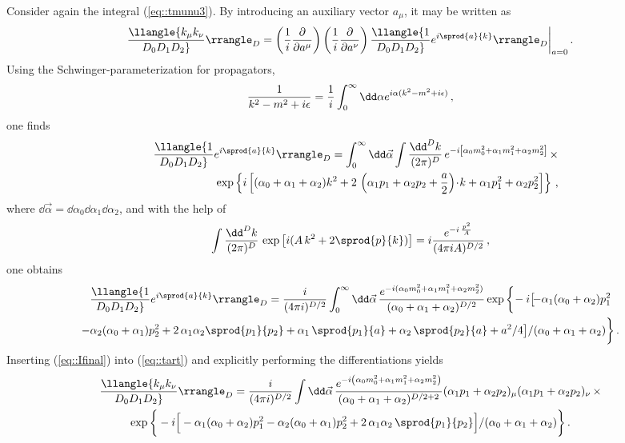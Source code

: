 Consider again the integral (\ref{eq::tmunu3}). By introducing an
auxiliary vector $a_\mu$, it may be written as
%
\begin{eqnarray}\label{eq::tart}
\llangle {k_\mu k_\nu\over D_0 D_1 D_2}\rrangle_D =
\left({1\over i}{\partial\over \partial a^\mu}\right)
\left({1\over i}{\partial\over \partial a^\nu}\right)
\llangle {1\over D_0 D_1 D_2} e^{i\sprod{a}{k}}\rrangle_D \bigg|_{a=0}\,.
\end{eqnarray}
%
Using the Schwinger-parameterization for propagators,
%
\begin{equation}
{1\over k^2-m^2+i\epsilon} = {1\over i}\int_0^\infty\dd\alpha
e^{i\alpha(k^2-m^2+i\epsilon)}\,,
\end{equation}
%
one finds
%
\begin{eqnarray}
  && \llangle {1\over D_0 D_1 D_2} e^{i\sprod{a}{k}}\rrangle_D =
  \int_0^\infty\dd\vec{\alpha} \int{\dd^D k\over (2\pi)^D}
  \,e^{-i\left[\alpha_0m_0^2 + \alpha_1m_1^2 + \alpha_2m_2^2\right]}\,
  \times\nonumber\\&&\mbox{\hspace{1ex}} \exp\left\{i\left[(\alpha_0 +
  \alpha_1 + \alpha_2)k^2 + 2\,\left(\alpha_1 p_1 + \alpha_2 p_2 +
  {a\over 2}\right)\!\cdot\!k + \alpha_1 p_1^2 + \alpha_2
  p_2^2\right]\right\}\,,
\end{eqnarray}
%
where $\dd\vec\alpha = \dd\alpha_0\dd\alpha_1\dd\alpha_2$, and with the
help of
%
\begin{equation}
\int {\dd^D k\over (2\pi)^D}\,\exp\left[i(A\,k^2 + 2\sprod{p}{k})\right] =
i{e^{-i\,{p^2\over A}}\over (4\pi i A)^{D/2}}\,,
\end{equation}
%
one obtains
%
\begin{multline}\label{eq::Ifinal}
 \llangle {1\over D_0 D_1 D_2} e^{i\sprod{a}{k}}\rrangle_D =
{i\over (4\pi i)^{D/2}}\int_0^\infty \dd\vec\alpha \,
{e^{-i(\alpha_0m_0^2 + \alpha_1m_1^2 + \alpha_2m_2^2)} \over 
  (\alpha_0 + \alpha_1 + \alpha_2)^{D/2}}  
\exp\bigg\{\!-i\bigl[\!-\alpha_1(\alpha_0 + \alpha_2)p_1^2 
\\- \alpha_2(\alpha_0 + \alpha_1)p_2^2  +
  2\,\alpha_1\alpha_2
  \sprod{p_1}{p_2} + 
 \alpha_1\,\sprod{p_1}{a} +
  \alpha_2\,\sprod{p_2}{a} + a^2/4\bigr]
  /(\alpha_0 
  + \alpha_1 + \alpha_2)\bigg\}\,.
\end{multline}
%
Inserting (\ref{eq::Ifinal}) into (\ref{eq::tart}) and explicitly
performing the differentiations yields
%
\begin{multline}
\llangle{k_\mu k_\nu\over D_0 D_1 D_2}\rrangle_D =
{i\over (4\pi i)^{D/2}}\int\dd \vec\alpha\,
{e^{-i\left(\alpha_0m_0^2 + \alpha_1m_1^2 + \alpha_2m_2^2\right)}
  \over
  (\alpha_0 + \alpha_1 + \alpha_2)^{D/2+2}}
(\alpha_1 p_1 + \alpha_2 p_2)_\mu (\alpha_1 p_1 + \alpha_2 p_2)_\nu
\, \times\\
\exp\bigg\{-i\Big[-\alpha_1(\alpha_0 + \alpha_2)p_1^2 -
\alpha_2(\alpha_0 + \alpha_1)p_2^2 + 2\,\alpha_1\alpha_2\,
  \sprod{p_1}{p_2} \Big]/(\alpha_0 + \alpha_1 + \alpha_2)\bigg\}\,.
\label{eq::alpha-param}
\end{multline}
